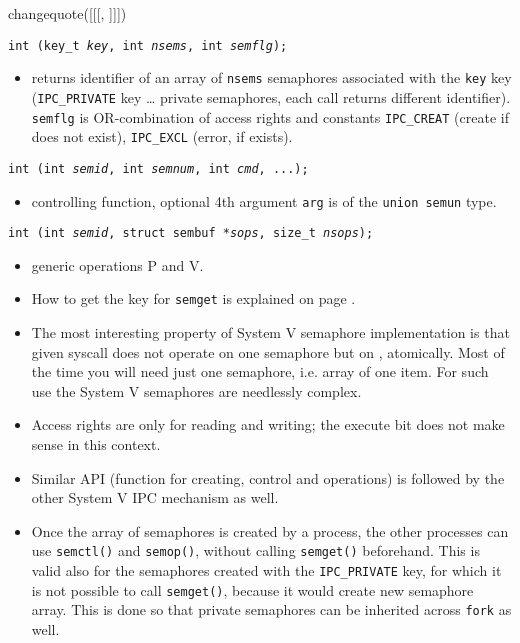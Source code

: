 
changequote([[[, ]]])


\begin{slide}
\texttt{int (key\_t \emph{key}, int \emph{nsems}, int
\emph{semflg});}
\begin{itemize}
\item returns identifier of an array of \texttt{nsems} semaphores associated
with the \texttt{key} key (\texttt{IPC\_PRIVATE} key \dots{} private semaphores,
each call returns different identifier). 
\texttt{semflg} is OR-combination of access rights and constants
\texttt{IPC\_CREAT} (create if does not exist),
\texttt{IPC\_EXCL} (error, if exists). 
\end{itemize}
\texttt{int (int \emph{semid}, int \emph{semnum},
int \emph{cmd}, ...);}
\begin{itemize}
\item controlling function, optional 4th argument \texttt{arg} is of the
\texttt{union~semun} type.
\end{itemize}
\texttt{int (int \emph{semid}, struct sembuf *\emph{sops}, size\_t
\emph{nsops});}
\begin{itemize}
\item generic operations P and V.
\end{itemize}
\end{slide}

\label{SYSVSEM}

\begin{itemize}
\item How to get the key for \texttt{semget} is explained on page
\pageref{FTOK}.
\item The most interesting property of System V semaphore implementation is
that given syscall does not operate on one semaphore but on , atomically.
Most of the time you will need just one semaphore, i.e. array of one item.
For such use the System V semaphores are needlessly complex.
\item Access rights are only for reading and writing; the execute bit does not
make sense in this context.
\item Similar API (function for creating, control and operations) is followed by
the other System V IPC mechanism as well.
\item Once the array of semaphores is created by a process, the other processes
can use \texttt{semctl()} and \texttt{semop()}, without calling
\texttt{semget()} beforehand. This is valid also for the semaphores created with
the \texttt{IPC\_PRIVATE} key, for which it is not possible to call
\texttt{semget()}, because it would create new semaphore array. This is done so
that private semaphores can be inherited across \texttt{fork} as well.
\end{itemize}

